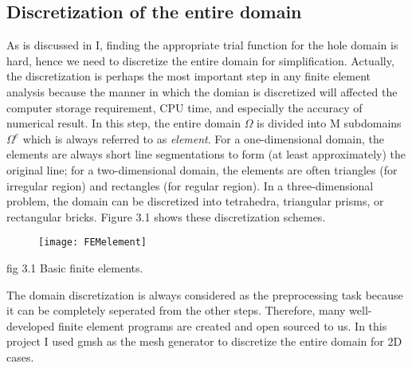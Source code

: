 \documentclass[journal]{IEEEtran}
\begin{document}
\subsection{Discretization of the entire domain}
As is discussed in I, finding the appropriate trial function for the hole domain is hard, hence we need to discretize the entire domain for simplification. Actually, the discretization is perhaps the most important step in any finite element analysis because the manner in which the domian is discretized will affected the computer storage requirement, CPU time, and especially the accuracy of numerical result. In this step, the entire domain $\Omega$ is divided into M subdomains $\Omega^e$ which is always referred to as \textit{element}. For a one-dimensional domain, the elements are always short line segmentations to form (at least approximately) the original line; for a two-dimensional domain, the elements are often triangles (for irregular region) and rectangles (for regular region). In a three-dimensional problem, the domain can be discretized into tetrahedra, triangular prisms, or rectangular bricks. Figure 3.1 shows these discretization schemes. 

\begin{figure}[h]
	\centering
	\texttt{[image: FEMelement]}
\end{figure}
\begin{center}
	\small fig 3.1 Basic finite elements.
\end{center}

The domain discretization is always considered as the preprocessing task because it can be completely seperated from the other steps. Therefore, many well-developed finite element programs are created and open sourced to us. In this project I used gmsh as the mesh generator to discretize the entire domain for 2D cases.
\end{document}
